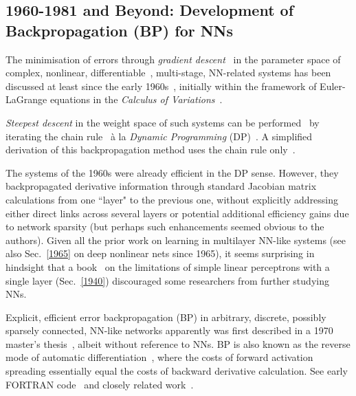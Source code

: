 \documentclass[letterpaper]{article}
\begin{document}
\begin{sloppypar}
\subsection{1960-1981 and Beyond: Development of Backpropagation (BP) for NNs}
\label{1970}
The minimisation of  
errors through {\em gradient descent}~\citep{hadamard1908memoire} in
the parameter space of complex, 
nonlinear, differentiable~\citep{leibniz1684}, multi-stage, NN-related systems has been discussed 
at least since the early 1960s~\citep[e.g.,][]{Kelley:1960,bryson:1961,BRYSON-DENHAM-61A,PONTRYAGIN61A,dreyfus:1962,Wilkinson:1965,Amari:1967:TAP,bryson1969applied,director:1969},
initially within the framework of Euler-LaGrange equations in the {\em Calculus of Variations}~\citep[e.g.,][]{Euler:1744}.

{\em Steepest descent} in the weight space of 
such systems can be performed~\citep{bryson:1961,Kelley:1960,bryson1969applied} 
by iterating the chain rule~\citep{leibniz:1676,de1716analyse} 
\`{a} la {\em Dynamic Programming} (DP)~\citep{Bellman:1957}.
A simplified derivation of this backpropagation method uses the chain rule only~\citep{dreyfus:1962}.

The systems of the 1960s were already efficient in the DP sense.
However, they backpropagated derivative information through
standard Jacobian matrix calculations from one ``layer" to the previous one,
without explicitly addressing either direct links across several layers or potential additional efficiency gains due to network sparsity 
(but perhaps such enhancements seemed obvious to the authors).
Given all the prior work on learning in multilayer NN-like systems (see also Sec.~\ref{1965}
on deep nonlinear nets since 1965),
it seems surprising in hindsight that a book~\citep{MinskyPapert:69} 
on the limitations of simple linear 
perceptrons with a single layer (Sec.~\ref{1940})
discouraged some researchers from further studying NNs.


Explicit, efficient error backpropagation (BP) in arbitrary, discrete, possibly sparsely connected, 
NN-like networks apparently was first described 
 in a 1970 master's thesis~\citep{Linnainmaa:1970,Linnainmaa:1976}, albeit without reference to NNs.
BP is also known as the reverse mode of automatic differentiation~\citep{Griewank:2012}, 
where the costs of forward activation spreading essentially equal the costs of backward 
derivative calculation. 
See early FORTRAN code~\citep{Linnainmaa:1970} and closely related work~\citep{ostrovskii:1971}.


\end{sloppypar}
\end{document}
